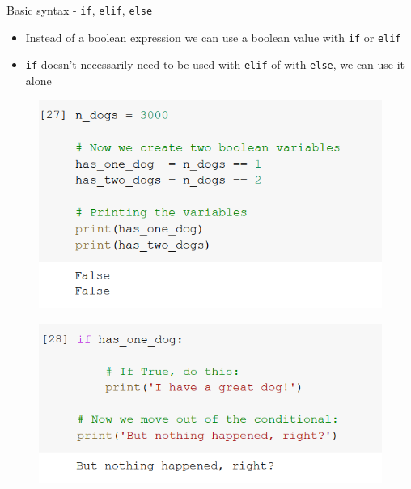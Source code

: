 \documentclass[aspectratio=169]{beamer}
\begin{document}
\begin{frame}{Basic syntax - \texttt{if}, \texttt{elif}, \texttt{else}}

	\begin{itemize}
		\item Instead of a boolean expression we can use a boolean value with \texttt{if} or \texttt{elif}
		\item \texttt{if} doesn't necessarily need to be used with \texttt{elif} of with \texttt{else}, we can use it alone
	\end{itemize}

	\begin{multicols}{2}

		\begin{figure}
			\centering
			\includegraphics[width=\linewidth]{img/boolean_variables.png}
		\end{figure}
		\begin{figure}
			\centering
			\includegraphics[width=\linewidth]{img/if_alone.png}
		\end{figure}

	\end{multicols}

\end{frame}
\end{document}
